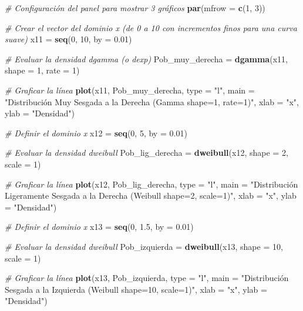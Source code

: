 \documentclass[
]{article}
\newenvironment{Shaded}{\begin{snugshade}}{\end{snugshade}}
\newcommand{\AttributeTok}[1]{\textcolor[rgb]{0.13,0.29,0.53}{#1}}
\newcommand{\CommentTok}[1]{\textcolor[rgb]{0.56,0.35,0.01}{\textit{#1}}}
\newcommand{\DecValTok}[1]{\textcolor[rgb]{0.00,0.00,0.81}{#1}}
\newcommand{\FloatTok}[1]{\textcolor[rgb]{0.00,0.00,0.81}{#1}}
\newcommand{\FunctionTok}[1]{\textcolor[rgb]{0.13,0.29,0.53}{\textbf{#1}}}
\newcommand{\NormalTok}[1]{#1}
\newcommand{\OtherTok}[1]{\textcolor[rgb]{0.56,0.35,0.01}{#1}}
\newcommand{\StringTok}[1]{\textcolor[rgb]{0.31,0.60,0.02}{#1}}
\begin{document}
\begin{Shaded}
\begin{Highlighting}[]
\CommentTok{\# Configuración del panel para mostrar 3 gráficos}
\FunctionTok{par}\NormalTok{(}\AttributeTok{mfrow =} \FunctionTok{c}\NormalTok{(}\DecValTok{1}\NormalTok{, }\DecValTok{3}\NormalTok{))}

\CommentTok{\# Crear el vector del dominio x (de 0 a 10 con incrementos finos para una curva suave)}
\NormalTok{x11 }\OtherTok{=} \FunctionTok{seq}\NormalTok{(}\DecValTok{0}\NormalTok{, }\DecValTok{10}\NormalTok{, }\AttributeTok{by =} \FloatTok{0.01}\NormalTok{)}

\CommentTok{\# Evaluar la densidad dgamma (o dexp)}
\NormalTok{Pob\_muy\_derecha }\OtherTok{=} \FunctionTok{dgamma}\NormalTok{(x11, }\AttributeTok{shape =} \DecValTok{1}\NormalTok{, }\AttributeTok{rate =} \DecValTok{1}\NormalTok{)}

\CommentTok{\# Graficar la línea}
\FunctionTok{plot}\NormalTok{(x11, Pob\_muy\_derecha, }\AttributeTok{type =} \StringTok{"l"}\NormalTok{, }
     \AttributeTok{main =} \StringTok{"Distribución Muy Sesgada a la Derecha (Gamma shape=1, rate=1)"}\NormalTok{,}
     \AttributeTok{xlab =} \StringTok{"x"}\NormalTok{, }\AttributeTok{ylab =} \StringTok{"Densidad"}\NormalTok{)}

\CommentTok{\# Definir el dominio x}
\NormalTok{x12 }\OtherTok{=} \FunctionTok{seq}\NormalTok{(}\DecValTok{0}\NormalTok{, }\DecValTok{5}\NormalTok{, }\AttributeTok{by =} \FloatTok{0.01}\NormalTok{)}

\CommentTok{\# Evaluar la densidad dweibull}
\NormalTok{Pob\_lig\_derecha }\OtherTok{=} \FunctionTok{dweibull}\NormalTok{(x12, }\AttributeTok{shape =} \DecValTok{2}\NormalTok{, }\AttributeTok{scale =} \DecValTok{1}\NormalTok{)}

\CommentTok{\# Graficar la línea}
\FunctionTok{plot}\NormalTok{(x12, Pob\_lig\_derecha, }\AttributeTok{type =} \StringTok{"l"}\NormalTok{, }
     \AttributeTok{main =} \StringTok{"Distribución Ligeramente Sesgada a la Derecha (Weibull shape=2, scale=1)"}\NormalTok{,}
     \AttributeTok{xlab =} \StringTok{"x"}\NormalTok{, }\AttributeTok{ylab =} \StringTok{"Densidad"}\NormalTok{)}

\CommentTok{\# Definir el dominio x}
\NormalTok{x13 }\OtherTok{=} \FunctionTok{seq}\NormalTok{(}\DecValTok{0}\NormalTok{, }\FloatTok{1.5}\NormalTok{, }\AttributeTok{by =} \FloatTok{0.01}\NormalTok{)}

\CommentTok{\# Evaluar la densidad dweibull}
\NormalTok{Pob\_izquierda }\OtherTok{=} \FunctionTok{dweibull}\NormalTok{(x13, }\AttributeTok{shape =} \DecValTok{10}\NormalTok{, }\AttributeTok{scale =} \DecValTok{1}\NormalTok{)}

\CommentTok{\# Graficar la línea}
\FunctionTok{plot}\NormalTok{(x13, Pob\_izquierda, }\AttributeTok{type =} \StringTok{"l"}\NormalTok{, }
     \AttributeTok{main =} \StringTok{"Distribución Sesgada a la Izquierda (Weibull shape=10, scale=1)"}\NormalTok{,}
     \AttributeTok{xlab =} \StringTok{"x"}\NormalTok{, }\AttributeTok{ylab =} \StringTok{"Densidad"}\NormalTok{)}
\end{Highlighting}
\end{Shaded}
\end{document}
